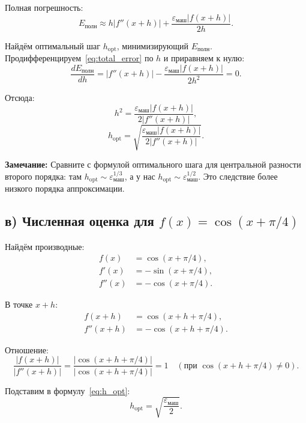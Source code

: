 \documentclass{article}
\begin{document}
Полная погрешность:
\begin{equation}
E_{\text{полн}} \approx h |f''(x+h)| + \frac{\varepsilon_{\text{маш}} |f(x+h)|}{2h}.
\label{eq:total_error}
\end{equation}

Найдём оптимальный шаг $h_{\text{opt}}$, минимизирующий $E_{\text{полн}}$. Продифференцируем~\eqref{eq:total_error} по $h$ и приравняем к нулю:
\begin{equation}
\frac{dE_{\text{полн}}}{dh} = |f''(x+h)| - \frac{\varepsilon_{\text{маш}} |f(x+h)|}{2h^2} = 0.
\end{equation}

Отсюда:
\begin{equation}
h^2 = \frac{\varepsilon_{\text{маш}} |f(x+h)|}{2|f''(x+h)|},
\end{equation}
\begin{equation}
\boxed{h_{\text{opt}} = \sqrt{\frac{\varepsilon_{\text{маш}} |f(x+h)|}{2|f''(x+h)|}}.}
\label{eq:h_opt}
\end{equation}

\textbf{Замечание:} Сравните с формулой оптимального шага для центральной разности второго порядка: там $h_{\text{opt}} \sim \varepsilon_{\text{маш}}^{1/3}$, а у нас $h_{\text{opt}} \sim \varepsilon_{\text{маш}}^{1/2}$. Это следствие более низкого порядка аппроксимации.

\subsection*{в) Численная оценка для $f(x) = \cos(x + \pi/4)$}

Найдём производные:
\begin{align}
f(x) &= \cos(x + \pi/4), \\
f'(x) &= -\sin(x + \pi/4), \\
f''(x) &= -\cos(x + \pi/4).
\end{align}

В точке $x+h$:
\begin{align}
f(x+h) &= \cos(x+h+\pi/4), \\
f''(x+h) &= -\cos(x+h+\pi/4).
\end{align}

Отношение:
\begin{equation}
\frac{|f(x+h)|}{|f''(x+h)|} = \frac{|\cos(x+h+\pi/4)|}{|\cos(x+h+\pi/4)|} = 1 \quad (\text{при } \cos(x+h+\pi/4) \neq 0).
\end{equation}

Подставим в формулу~\eqref{eq:h_opt}:
\begin{equation}
h_{\text{opt}} = \sqrt{\frac{\varepsilon_{\text{маш}}}{2}}.
\end{equation}
\end{document}
